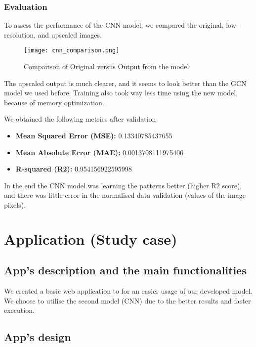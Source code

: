 \documentclass[runningheads,a4paper,11pt]{report}
\begin{document}
\subsection{Evaluation}
To assess the performance of the CNN model, we compared the original, low-resolution, and upscaled images. 
\begin{figure}[H]
    \centering
    \texttt{[image: cnn\_comparison.png]}
    \caption{Comparison of Original versus Output from the model}
    \label{fig:cnnComparison}
\end{figure}

The upscaled output is much clearer, and it seems to look better than the GCN model we used before. Training also took way less time using the new model, because of memory optimization. 

We obtained the following metrics after validation
\begin{itemize} 
    \item \textbf{Mean Squared Error (MSE):} 0.13340785437655 
    \item \textbf{Mean Absolute Error (MAE):} 0.0013708111975406 
    \item \textbf{R-squared (R2):} 0.954156922595998
\end{itemize}

In the end the CNN model was learning the patterns better (higher R2 score), and there was little error in the normalised data validation (values of the image pixels).





\chapter{Application (Study case)}
\label{chapter:application}


\section{App's description  and the main functionalities}
\label{section:appDescription}

We created a basic web application to for an easier usage of our developed model. We choose to utilise the second model (CNN) due to the better results and faster execution.


\section{App's design}
\label{section:appDesign}
\end{document}
